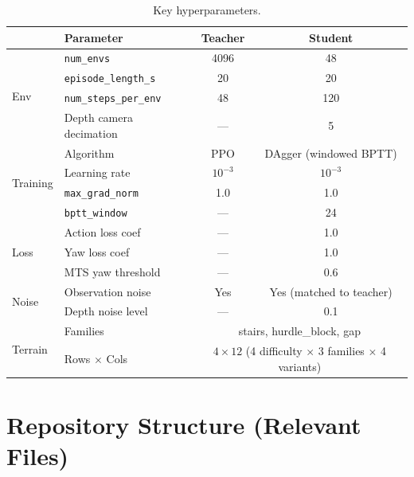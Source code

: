 \documentclass[11pt,a4paper]{article}
\begin{document}
\begin{table}[ht]
\centering
\caption{Key hyperparameters.}
\begin{tabular}{llcc}
\toprule
& Parameter & Teacher & Student \\
\midrule
\multirow{4}{*}{Env}
& \texttt{num\_envs} & 4096 & 48 \\
& \texttt{episode\_length\_s} & 20 & 20 \\
& \texttt{num\_steps\_per\_env} & 48 & 120 \\
& Depth camera decimation & --- & 5 \\
\midrule
\multirow{4}{*}{Training}
& Algorithm & PPO & DAgger (windowed BPTT) \\
& Learning rate & $10^{-3}$ & $10^{-3}$ \\
& \texttt{max\_grad\_norm} & 1.0 & 1.0 \\
& \texttt{bptt\_window} & --- & 24 \\
\midrule
\multirow{3}{*}{Loss}
& Action loss coef & --- & 1.0 \\
& Yaw loss coef & --- & 1.0 \\
& MTS yaw threshold & --- & 0.6 \\
\midrule
\multirow{2}{*}{Noise}
& Observation noise & Yes & Yes (matched to teacher) \\
& Depth noise level & --- & 0.1 \\
\midrule
\multirow{2}{*}{Terrain}
& Families & \multicolumn{2}{c}{stairs, hurdle\_block, gap} \\
& Rows $\times$ Cols & \multicolumn{2}{c}{$4 \times 12$ (4 difficulty $\times$ 3 families $\times$ 4 variants)} \\
\bottomrule
\end{tabular}
\end{table}

\section{Repository Structure (Relevant Files)}
\end{document}
